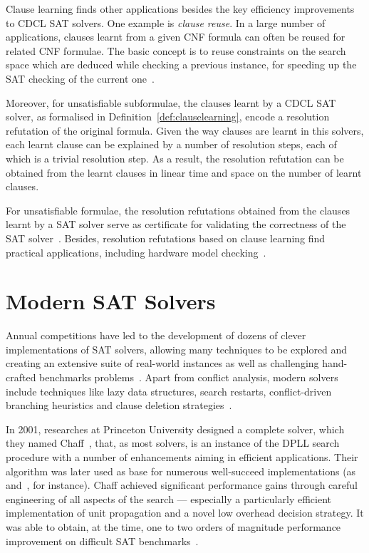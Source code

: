 Clause learning finds other applications besides the key efficiency improvements
to CDCL SAT solvers. One example is \emph{clause reuse}. In a large number of
applications, clauses learnt from a given CNF formula can often be reused for
related CNF formulae. The basic concept is to reuse constraints on the search
space which are deduced while checking a previous instance, for speeding up the
SAT checking of the current one~\cite{shtrichman2001pruning}.

Moreover, for unsatisfiable subformulae, the clauses learnt by a CDCL SAT
solver, as formalised in Definition~\ref{def:clauselearning}, encode a
resolution refutation of the original formula. Given the way clauses are learnt
in this solvers, each learnt clause can be explained by a number of resolution
steps, each of which is a trivial resolution step. As a result, the resolution
refutation can be obtained from the learnt clauses in linear time and space on
the number of learnt clauses. 

For unsatisfiable formulae, the resolution refutations obtained from the clauses
learnt by a SAT solver serve as certificate for validating the correctness of
the SAT solver~\cite{cdclchapter}. Besides, resolution refutations based on
clause learning find practical applications, including hardware model
checking~\cite{mcmillan2003interpolation}.

\section{Modern SAT Solvers}%
\label{sec:modern}

Annual competitions have led to the development of dozens of clever
implementations of SAT solvers, allowing many techniques to be explored and
creating an extensive suite of real-world instances as well as challenging
hand-crafted benchmarks problems~\cite{satchapter}. Apart from conflict
analysis, modern solvers include techniques like lazy data structures, search
restarts, conflict-driven branching heuristics and clause deletion
strategies~\cite{cdclchapter}.  

In 2001, researches at Princeton University designed a complete solver, which
they named Chaff~\cite{moskewicz2001chaff}, that, as most solvers, is an
instance of the DPLL search procedure with a number of enhancements aiming in
efficient applications.  Their algorithm was later used as base for numerous
well-succeed implementations (as~\cite{chrabakh2003gridsat} and~\cite{minisat},
for instance). Chaff achieved significant performance gains through careful
engineering of all aspects of the search --- especially a particularly efficient
implementation of unit propagation and a novel low overhead decision strategy.
It was able to obtain, at the time, one to two orders of magnitude performance
improvement on difficult SAT benchmarks~\cite{moskewicz2001chaff}.

